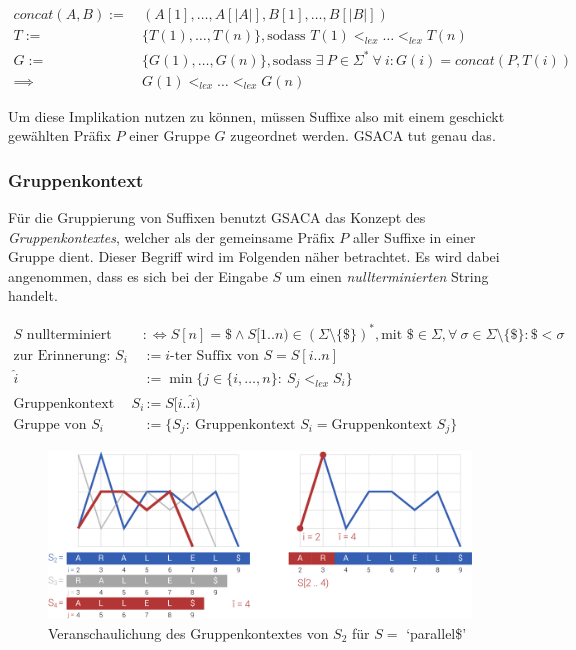 \documentclass[twoside,a4paper,11pt]{article}
\theoremstyle{break}
\begin{document}
\begin{align*}
	concat(A, B) :=\ &(A[1], \dots, A[|A|], B[1], \dots, B[|B|]) \\
	T :=\ &\{ T(1), \dots, T(n) \}, \text{sodass } T(1) <_{lex} \dots <_{lex} T(n) \\
	G :=\ &\{ G(1), \dots, G(n) \}, \text{sodass } \exists\ P \in \Sigma^*\ \forall\ i: G(i) = concat(P, T(i)) \\
	\implies &G(1) <_{lex} \dots <_{lex} G(n)
\end{align*}

Um diese Implikation nutzen zu können, müssen Suffixe also mit einem geschickt gewählten Präfix $P$ einer Gruppe $G$ zugeordnet werden. GSACA tut genau das.

\subsubsection{Gruppenkontext}

Für die Gruppierung von Suffixen benutzt GSACA das Konzept des \textit{Gruppenkontextes}, welcher als der gemeinsame Präfix $P$ aller Suffixe in einer Gruppe dient. Dieser Begriff wird im Folgenden näher betrachtet. Es wird dabei angenommen, dass es sich bei der Eingabe $S$ um einen \textit{nullterminierten} String handelt.

\begin{align*}
	S \text{ nullterminiert} &:\Leftrightarrow S[n] = \$ \land S[1..n) \in (\Sigma \setminus \{\$\})^*, \text{mit } \$ \in \Sigma, \forall\ \sigma \in \Sigma \setminus \{\$\}: \$ < \sigma \\
	\text{zur Erinnerung: } S_i &:= \text{$i$-ter Suffix von $S$} = S[i .. n] \\
	\widehat{i} &:= \min \{ j \in \{ i, \dots, n \}:\ S_j <_{lex} S_i \} \\
	\text{Gruppenkontext von } S_i &:= S[i .. \widehat{i}) \\
	\text{Gruppe von } S_i &:= \{ S_j:\ \text{Gruppenkontext } S_i = \text{Gruppenkontext } S_j \}
\end{align*}

\begin{figure}[h]
	\centering
	\includegraphics[width=\linewidth,bb=0 0 1316 522]{./assets/groupContext.pdf}
	\caption{Veranschaulichung des Gruppenkontextes von $S_2$ für $S =$ `parallel\$'}
\label{fig:groupContext}
\end{figure}
\end{document}
